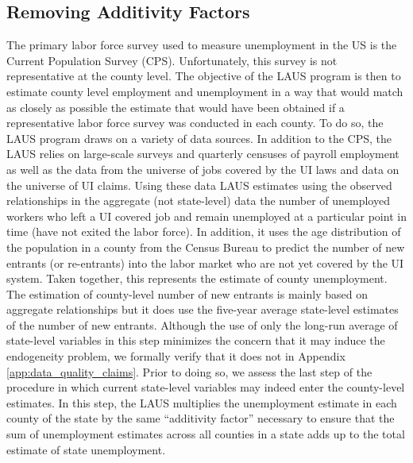 \documentclass[12pt]{article}
\newcommand{\1}{\mathbf{1}}
\begin{document}
\begin{appendix}
\subsection{Removing Additivity Factors}
\label{app:data_quality_additivity}
The primary labor force survey used to measure unemployment in the US is the Current Population Survey (CPS). Unfortunately, this survey is not representative at the county level. The objective of the LAUS program is then to estimate county level employment and unemployment in a way that would match as closely as possible the estimate that would have been obtained if a representative labor force survey was conducted in each county. To do so, the LAUS program draws on a variety of data sources. In addition to the CPS, the LAUS relies on large-scale surveys and quarterly censuses of payroll employment as well as the data from the universe of jobs covered by the UI laws and data on the universe of UI claims. Using these data LAUS estimates using the observed relationships in the aggregate (not state-level) data the number of unemployed workers who left a UI covered job and remain unemployed at a particular point in time (have not exited the labor force). In addition, it uses the age distribution of the population in a county from the Census Bureau to predict the number of new entrants (or re-entrants) into the labor market who are not yet covered by the UI system. Taken together, this represents the estimate of county unemployment. The estimation of county-level number of new entrants is mainly based on aggregate relationships but it does use the five-year average state-level estimates of the number of new entrants. Although the use of only the long-run average of state-level variables in this step minimizes the concern that it may induce the endogeneity problem, we formally verify that it does not in Appendix \ref{app:data_quality_claims}.
Prior to doing so, we assess the last step of the procedure in which current state-level variables may indeed enter the county-level estimates. In this step, the LAUS multiplies the unemployment estimate in each county of the state by the same ``additivity factor'' necessary to ensure that the sum of unemployment estimates across all counties in a state adds up to the total estimate of state unemployment.


\end{appendix}
\end{document}

